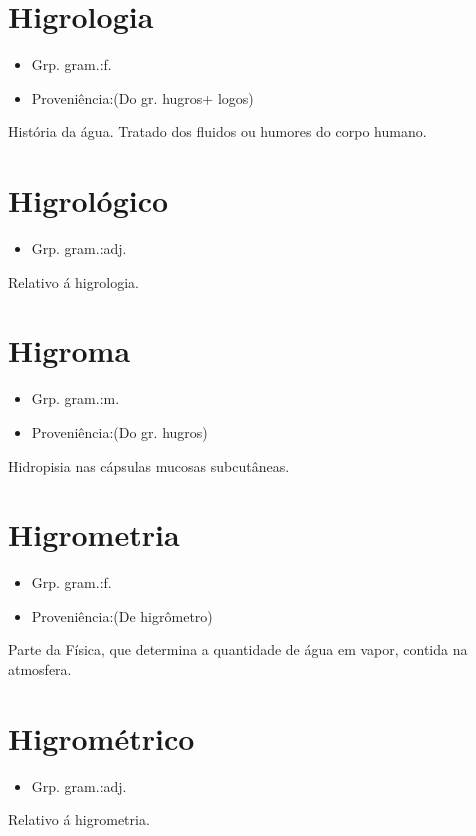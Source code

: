 \documentclass{article}
\begin{document}
\section{Higrologia}
\begin{itemize}
\item {Grp. gram.:f.}
\end{itemize}
\begin{itemize}
\item {Proveniência:(Do gr. \textunderscore hugros\textunderscore  + \textunderscore logos\textunderscore )}
\end{itemize}
História da água.
Tratado dos fluidos ou humores do corpo humano.
\section{Higrológico}
\begin{itemize}
\item {Grp. gram.:adj.}
\end{itemize}
Relativo á higrologia.
\section{Higroma}
\begin{itemize}
\item {Grp. gram.:m.}
\end{itemize}
\begin{itemize}
\item {Proveniência:(Do gr. \textunderscore hugros\textunderscore )}
\end{itemize}
Hidropisia nas cápsulas mucosas subcutâneas.
\section{Higrometria}
\begin{itemize}
\item {Grp. gram.:f.}
\end{itemize}
\begin{itemize}
\item {Proveniência:(De \textunderscore higrômetro\textunderscore )}
\end{itemize}
Parte da Física, que determina a quantidade de água em vapor, contida na atmosfera.
\section{Higrométrico}
\begin{itemize}
\item {Grp. gram.:adj.}
\end{itemize}
Relativo á higrometria.
\end{document}
